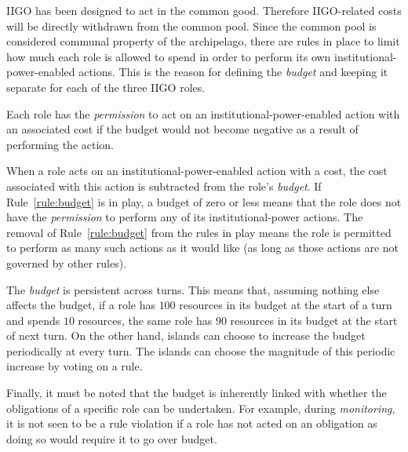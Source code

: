 IIGO has been designed to act in the common good. Therefore IIGO-related costs will be directly withdrawn from the common pool. Since the common pool is considered communal property of the archipelago, there are rules in place to limit how much each role is allowed to spend in order to perform its own institutional-power-enabled actions. This is the reason for defining the \emph{budget} and keeping it separate for each of the three IIGO roles.

\begin{rule_IIGO} \label{rule:budget}
    Each role has the \emph{permission} to act on an institutional-power-enabled action with an associated cost if the budget would not become negative as a result of performing the action.
 \end{rule_IIGO}



When a role acts on an institutional-power-enabled action with a cost, the cost associated with this action is subtracted from the role's \emph{budget}. If Rule~\ref{rule:budget} is in play, a budget of zero or less means that the role does not have the \emph{permission} to perform any of its institutional-power actions. The removal of Rule~\ref{rule:budget} from the rules in play means the role is permitted to perform as many such actions as it would like (as long as those actions are not governed by other rules).

The \emph{budget} is persistent across turns. This means that, assuming nothing else affects the budget, if a role has $100$ resources in its budget at the start of a turn and spends $10$ resources, the same role has $90$ resources in its budget at the start of next turn. On the other hand, islands can choose to increase the budget periodically at every turn. The islands can choose the magnitude of this periodic increase by voting on a rule.




Finally, it must be noted that the budget is inherently linked with  whether the obligations of a specific role can be undertaken.
For example, during \emph{monitoring}, it is not seen to be a rule violation if a role has not acted on an obligation as doing so would require it to go over budget.



